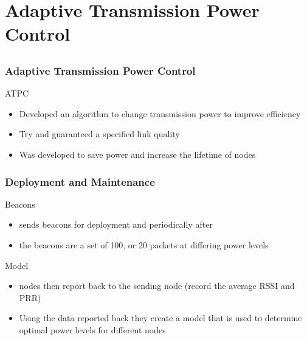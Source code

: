 \section{Adaptive Transmission Power Control}
\subsection*{}


\begin{frame}[t]
  \frametitle{Adaptive Transmission Power Control}
  
  ATPC
  \begin{itemize}
  \item Developed an algorithm to change transmission power to improve efficiency
  \item Try and guaranteed a specified link quality
  \item Was developed to save power and increase the lifetime of nodes
  \end{itemize}

  \vfill

  \begin{flushleft}
    \begin{tiny}
      \begin{minipage}{1.0\linewidth}
      \end{minipage}
    \end{tiny}
  \end{flushleft}
  
\end{frame}

\begin{frame}[t]
  \frametitle{Deployment and Maintenance}

  Beacons
  \begin{itemize}
  \item sends beacons for deployment and periodically after
  \item the beacons are a set of 100, or 20 packets at differing power levels
  \end{itemize}

  Model
  \begin{itemize}
  \item nodes then report back to the sending node (record the average RSSI and PRR)
  \item Using the data reported back they create a model that is used to determine optimal power levels for different nodes
  \end{itemize}

  \vfill

  \begin{flushleft}
    \begin{tiny}
      \begin{minipage}{1.0\linewidth}
      \end{minipage}
    \end{tiny}
  \end{flushleft}
  
\end{frame}

